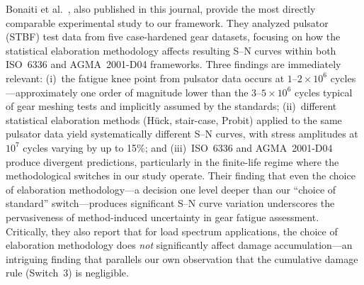 \documentclass[12pt,a4paper]{article}
\begin{document}
Bonaiti et al.~\cite{bonaiti2024}, also published in this journal,
provide the most directly comparable experimental study to our framework.
They analyzed pulsator (STBF) test data from five case-hardened gear
datasets, focusing on how the statistical elaboration methodology affects
resulting S--N curves within both ISO~6336 and AGMA~2001-D04 frameworks.
Three findings are immediately relevant: (i)~the fatigue knee point from
pulsator data occurs at $1$--$2\times10^6$ cycles---approximately one
order of magnitude lower than the $3$--$5\times10^6$ cycles typical of
gear meshing tests and implicitly assumed by the standards; (ii)~different
statistical elaboration methods (H\"uck, stair-case, Probit) applied to
the same pulsator data yield systematically different S--N curves, with
stress amplitudes at $10^7$ cycles varying by up to 15\%; and
(iii)~ISO~6336 and AGMA~2001-D04 produce divergent predictions,
particularly in the finite-life regime where the methodological switches
in our study operate. Their finding that even the choice of elaboration
methodology---a decision one level deeper than our ``choice of standard''
switch---produces significant S--N curve variation underscores the
pervasiveness of method-induced uncertainty in gear fatigue assessment.
Critically, they also report that for load spectrum applications, the
choice of elaboration methodology does \emph{not} significantly affect
damage accumulation---an intriguing finding that parallels our own
observation that the cumulative damage rule (Switch~3) is negligible.
\end{document}
